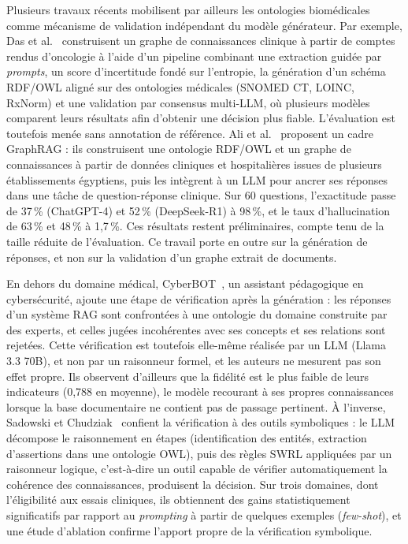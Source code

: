 Plusieurs travaux récents mobilisent par ailleurs les ontologies biomédicales comme mécanisme de validation indépendant du modèle générateur. Par exemple, Das et al.~\cite{das2026clinical} construisent un graphe de connaissances clinique à partir de comptes rendus d'oncologie à l'aide d'un pipeline combinant une extraction guidée par \textit{prompts}, un score d'incertitude fondé sur l'entropie, la génération d'un schéma RDF/OWL aligné sur des ontologies médicales (SNOMED CT, LOINC, RxNorm) et une validation par consensus multi-LLM, où plusieurs modèles comparent leurs résultats afin d'obtenir une décision plus fiable. L'évaluation est toutefois menée sans annotation de référence. Ali et al.~\cite{ali2026ontology} proposent un cadre GraphRAG : ils construisent une ontologie RDF/OWL et un graphe de connaissances à partir de données cliniques et hospitalières issues de plusieurs établissements égyptiens, puis les intègrent à un LLM pour ancrer ses réponses dans une tâche de question-réponse clinique. Sur 60 questions, l'exactitude passe de 37\,\% (ChatGPT-4) et 52\,\% (DeepSeek-R1) à 98\,\%, et le taux d'hallucination de 63\,\% et 48\,\% à 1,7\,\%. Ces résultats restent préliminaires, compte tenu de la taille réduite de l'évaluation. Ce travail porte en outre sur la génération de réponses, et non sur la validation d'un graphe extrait de documents.

En dehors du domaine médical, CyberBOT~\cite{zhao2025cyberbot}, un assistant pédagogique en cybersécurité, ajoute une étape de vérification après la génération : les réponses d'un système RAG sont confrontées à une ontologie du domaine construite par des experts, et celles jugées incohérentes avec ses concepts et ses relations sont rejetées. Cette vérification est toutefois elle-même réalisée par un LLM (Llama 3.3 70B), et non par un raisonneur formel, et les auteurs ne mesurent pas son effet propre. Ils observent d'ailleurs que la fidélité est le plus faible de leurs indicateurs (0,788 en moyenne), le modèle recourant à ses propres connaissances lorsque la base documentaire ne contient pas de passage pertinent. À l'inverse, Sadowski et Chudziak~\cite{sadowski2026structured} confient la vérification à des outils symboliques : le LLM décompose le raisonnement en étapes (identification des entités, extraction d'assertions dans une ontologie OWL), puis des règles SWRL appliquées par un raisonneur logique, c'est-à-dire un outil capable de vérifier automatiquement la cohérence des connaissances, produisent la décision. Sur trois domaines, dont l'éligibilité aux essais cliniques, ils obtiennent des gains statistiquement significatifs par rapport au \textit{prompting} à partir de quelques exemples (\textit{few-shot}), et une étude d'ablation confirme l'apport propre de la vérification symbolique.

